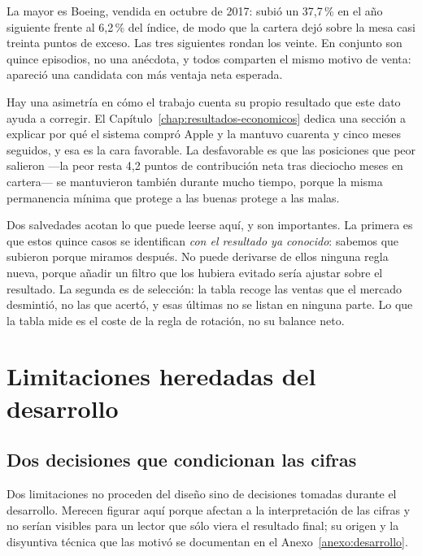 \begin{table}[htbp]
  \centering
  \small
  \caption{Ventas que el mercado desmintió: exceso no cobrado en los doce meses siguientes.}
  \label{tab:ventas-prematuras}
  
  \caption*{Todas se vendieron por el mismo motivo: otra candidata ofrecía mayor ventaja neta
  esperada.}
\end{table}

La mayor es Boeing, vendida en octubre de 2017: subió un 37,7\,\% en el año siguiente frente al
6,2\,\% del índice, de modo que la cartera dejó sobre la mesa casi treinta puntos de exceso. Las tres
siguientes rondan los veinte. En conjunto son quince episodios, no una anécdota, y todos comparten el
mismo motivo de venta: apareció una candidata con más ventaja neta esperada.

Hay una asimetría en cómo el trabajo cuenta su propio resultado que este dato ayuda a corregir. El
Capítulo~\ref{chap:resultados-economicos} dedica una sección a explicar por qué el sistema compró
Apple y la mantuvo cuarenta y cinco meses seguidos, y esa es la cara favorable. La desfavorable es que las
posiciones que peor salieron ---la peor resta 4,2 puntos de contribución neta tras dieciocho meses en
cartera--- se mantuvieron también durante mucho tiempo, porque la misma permanencia mínima que
protege a las buenas protege a las malas.

Dos salvedades acotan lo que puede leerse aquí, y son importantes. La primera es que estos quince
casos se identifican \emph{con el resultado ya conocido}: sabemos que subieron porque miramos después.
No puede derivarse de ellos ninguna regla nueva, porque añadir un filtro que los hubiera evitado sería
ajustar sobre el resultado. La segunda es de selección: la tabla recoge las ventas que el mercado
desmintió, no las que acertó, y esas últimas no se listan en ninguna parte. Lo que la tabla mide es el
coste de la regla de rotación, no su balance neto.

\section{Limitaciones heredadas del desarrollo}

\subsection{Dos decisiones que condicionan las cifras}

Dos limitaciones no proceden del diseño sino de decisiones tomadas durante el desarrollo. Merecen
figurar aquí porque afectan a la interpretación de las cifras y no serían visibles para un lector
que sólo viera el resultado final; su origen y la disyuntiva técnica que las motivó se documentan en
el Anexo~\ref{anexo:desarrollo}.

